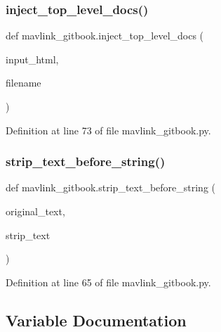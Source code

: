 \mbox{\label{namespacemavlink__gitbook_aad1447f419d684664763e7e17fce7e2c}} 
\subsubsection{\texorpdfstring{inject\_top\_level\_docs()}{inject\_top\_level\_docs()}}
{\footnotesize\ttfamily def mavlink\+\_\+gitbook.\+inject\+\_\+top\+\_\+level\+\_\+docs (\begin{DoxyParamCaption}\item[{}]{input\+\_\+html,  }\item[{}]{filename }\end{DoxyParamCaption})}



Definition at line 73 of file mavlink\+\_\+gitbook.\+py.

\mbox{\label{namespacemavlink__gitbook_ac690fc1c1dea8fbf781656c303caace3}} 
\subsubsection{\texorpdfstring{strip\_text\_before\_string()}{strip\_text\_before\_string()}}
{\footnotesize\ttfamily def mavlink\+\_\+gitbook.\+strip\+\_\+text\+\_\+before\+\_\+string (\begin{DoxyParamCaption}\item[{}]{original\+\_\+text,  }\item[{}]{strip\+\_\+text }\end{DoxyParamCaption})}



Definition at line 65 of file mavlink\+\_\+gitbook.\+py.



\subsection{Variable Documentation}
\mbox{\label{namespacemavlink__gitbook_a5f783465a58c3fc0dc9a7c5513c06e77}} 
